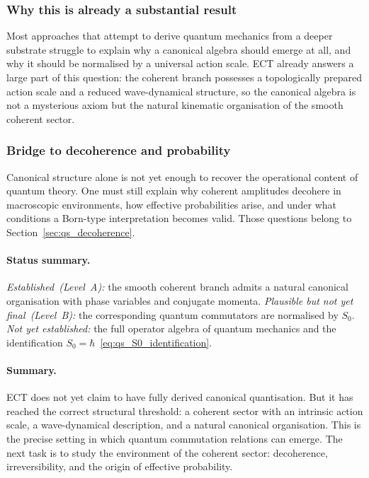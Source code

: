 \subsubsection*{Why this is already a substantial result}

Most approaches that attempt to derive quantum mechanics from a deeper
substrate struggle to explain why a canonical algebra should emerge at
all, and why it should be normalised by a universal action scale.
ECT already answers a large part of this question: the coherent branch
possesses a topologically prepared action scale and a reduced
wave-dynamical structure, so the canonical algebra is not a mysterious
axiom but the natural kinematic organisation of the smooth coherent
sector.

\subsubsection*{Bridge to decoherence and probability}

Canonical structure alone is not yet enough to recover the operational
content of quantum theory.
One must still explain why coherent amplitudes decohere in macroscopic
environments, how effective probabilities arise, and under what
conditions a Born-type interpretation becomes valid.
Those questions belong to Section~\ref{sec:qs_decoherence}.

\paragraph{Status summary.}
\textit{Established~(Level~A):}
the smooth coherent branch admits a natural canonical organisation with
phase variables and conjugate momenta.
\textit{Plausible but not yet final~(Level~B):}
the corresponding quantum commutators are normalised by $S_0$.
\textit{Not yet established:}
the full operator algebra of quantum mechanics and the identification
$S_0=\hbar$~\eqref{eq:qs_S0_identification}.

\paragraph{Summary.}
ECT does not yet claim to have fully derived canonical quantisation.
But it has reached the correct structural threshold: a coherent sector
with an intrinsic action scale, a wave-dynamical description, and a
natural canonical organisation.
This is the precise setting in which quantum commutation relations can
emerge.
The next task is to study the environment of the coherent sector:
decoherence, irreversibility, and the origin of effective probability.

